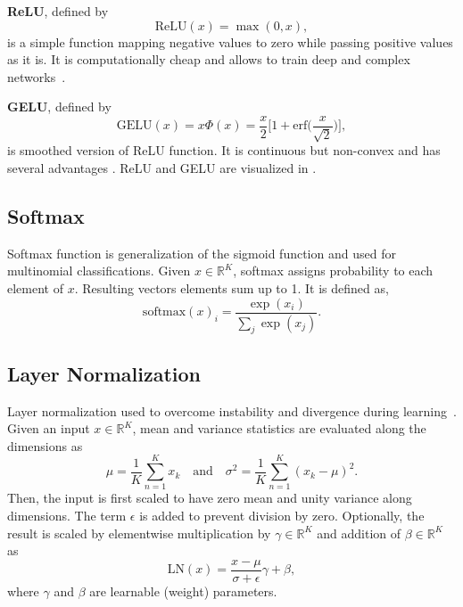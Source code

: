 \textbf{ReLU}, defined by
\begin{equation}
\label{eqn:relu_fcn}
\textrm{ReLU}(x) = \max(0, x),
\end{equation}
is a simple function mapping negative values to zero while passing positive values as it is. It is computationally cheap and allows to train deep and complex networks~\cite{glorot_deep_2011}.

\textbf{GELU}, defined by
\begin{equation}
\label{eqn:gelu_fcn}
\textrm{GELU}(x) = x \Phi(x) = \frac{x}{2} \bigg[ 1 + \textrm{erf} \Big( \frac{x}{\sqrt{2}} \Big) \bigg],
\end{equation}
is smoothed version of ReLU function. It is continuous but non-convex and has several advantages \cite{hendrycks_gaussian_2020}. ReLU and GELU are visualized in  . 

\subsection{Softmax}

Softmax function is generalization of the sigmoid function and used for multinomial classifications. 
Given $x \in \mathbb{R}^K$, softmax assigns probability to each element of $x$. 
Resulting vectors elements sum up to 1.
It is defined as,
\begin{equation}
\label{eqn:softmax_fcn}
\text{softmax}(x)_i = \frac{\exp(x_i)}{\sum_j \exp(x_j)}.
\end{equation}

\subsection{Layer Normalization}

Layer normalization used to overcome instability and divergence during learning~\cite{ba_layer_2016}. 
Given an input $x \in \mathbb{R}^K$, mean and variance statistics are evaluated along the dimensions as  
\begin{equation}
\label{eq:layernorm_statistics}
\mu = \frac{1}{K} \sum_{n=1}^{K} x_k \quad \text{and} \quad
\sigma^2 = \frac{1}{K} \sum_{n=1}^{K} (x_k-\mu)^2.
\end{equation} 
Then, the input is first scaled to have zero mean and unity variance along dimensions. 
The term $\epsilon$ is added to prevent division by zero. 
Optionally, the result is scaled by elementwise multiplication by $\gamma \in \mathbb{R}^K$ and addition of $\beta \in \mathbb{R}^K$ as
\begin{equation}
\label{eqn:layernorm}
\mathrm{LN}(x) = \frac{x-\mu}{\sigma+\epsilon} \gamma + \beta,
\end{equation}
where $\gamma$ and $\beta$ are learnable (weight) parameters. 
